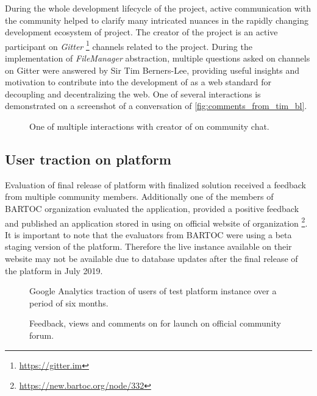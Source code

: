 During the whole development lifecycle of the \lpas{} project, active communication with the community helped to clarify many intricated nuances in the rapidly changing development ecosystem of \solid{} project. The creator of the \solid{} project is an active participant on \textit{Gitter} \footnote{\url{https://gitter.im}} channels related to the project. During the implementation of \textit{FileManager} abstraction, multiple questions asked on \solid{} channels on Gitter were answered by Sir Tim Berners-Lee, providing useful insights and motivation to contribute into the development of \solid{} as a web standard for decoupling and decentralizing the web. One of several interactions is demonstrated on a screenshot of a conversation of \autoref{fig:comments_from_tim_bl}.

\begin{figure}[h]
\centering
{}
\caption{One of multiple interactions with creator of \solid{} on \solid{} community chat.}
\label{fig:comments_from_tim_bl}
\end{figure}

\subsection{User traction on \lpa{} platform}
\label{sssec:user_traction_of_platform}

Evaluation of final release of \lpa{} platform with finalized \lpas{} solution received a feedback from multiple \solid{} community members. Additionally one of the members of \acrfull{BARTOC} organization evaluated the application, provided a positive feedback and published an application stored in \solid{} using \lpas{} on official website of organization \footnote{\url{https://new.bartoc.org/node/332}}. It is important to note that the evaluators from BARTOC were using a beta staging version of the \lpa{} platform. Therefore the live instance available on their website may not be available due to database updates after the final release of the platform in July 2019.

\begin{figure}[hbt]
  \caption{Google Analytics traction of users of test \lpa{} platform instance over a period of six months.}
  \label{fig:google_analytics_users}
\endminipage\hfill
{}
  \caption{Feedback, views and comments on for \lpa{} launch on official \solid{} community forum.}
  \label{fig:community_post_users}
\endminipage\hfill
\end{figure}

